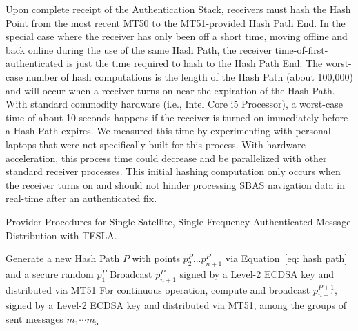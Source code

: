 \documentclass[letterpaper,times]{IONconf/IONconf}
\begin{document}
		Upon complete receipt of the Authentication Stack, receivers must hash the Hash Point from the most recent MT50 to the MT51-provided Hash Path End.
		In the special case where the receiver has only been off a short time, moving offline and back online during the use of the same Hash Path, the receiver time-of-first-authenticated is just the time required to hash to the Hash Path End.
		The worst-case number of hash computations is the length of the Hash Path (about 100,000) and will occur when a receiver turns on near the expiration of the Hash Path.
		With standard commodity hardware (i.e., Intel Core i5 Processor), a worst-case time of about 10 seconds happens if the receiver is turned on immediately before a Hash Path expires.
		We measured this time by experimenting with personal laptops that were not specifically built for this process.
		With hardware acceleration, this process time could decrease and be parallelized with other standard receiver processes.
		This initial hashing computation only occurs when the receiver turns on and should not hinder processing SBAS navigation data in real-time after an authenticated fix.

		\begin{algorithm}%
			\caption{Provider Procedures for Single Satellite, Single Frequency Authenticated Message Distribution with TESLA.}
			\label{alg: TESLA provider}
			\SetAlgoLined
			Generate a new Hash Path $P$ with points $p^P_2 ... p^P_{n+1}$ via Equation~\eqref{eq: hash path} and a secure random $p^P_1$\;
			Broadcast $p^P_{n+1}$ signed by a Level-2 ECDSA key and distributed via MT51\;
			For continuous operation, compute and broadcast $p^{P+1}_{n+1}$, signed by a Level-2 ECDSA key and distributed via MT51, among the groups of sent messages $m_1 \cdots m_5$\;
		\end{algorithm}
\end{document}
